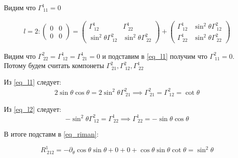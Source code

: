 \documentclass[a4paper]{article}
\numberwithin{equation}{section}
\begin{document}
Видим что $\Gamma^1_{\ 11} = 0$ 

\begin{gather}
    \label{eq_l2}
    l = 2: 
    \begin{pmatrix}
        0 & 0 \\
        0 & 0
    \end{pmatrix}
    = 
    \begin{pmatrix}
        \Gamma^1_{\ 12} & \Gamma^1_{\ 22} \\
        \sin^2 \theta \Gamma^2_{\ 12} & \sin^2 \theta \Gamma^2_{\ 22}
    \end{pmatrix}
    + 
    \begin{pmatrix}
        \Gamma^1_{\ 12} & \sin^2 \theta \Gamma^2_{\ 12}  \\
        \Gamma^1_{\ 22} & \sin^2 \theta \Gamma^2_{\ 22}
    \end{pmatrix}
\end{gather}

Видим что $\Gamma^2_{\ 22} = \Gamma^1_{\ 12} = \Gamma^1_{\ 21} = 0$ 
и подставим в \ref{eq_l1} получим что $\Gamma^2_{\ 11} = 0$. 
Потому будем  считать компонеты $\Gamma^{2}_{\ 21}, \Gamma^{2}_{\ 12}, \Gamma^{1}_{\ 22}$

Из \ref{eq_l1} следует:
\begin{gather}
    2 \sin \theta \cos \theta = 2 \sin^2 \theta \Gamma^2_{\ 21} \implies 
    \Gamma^2_{\ 21} = \Gamma^2_{\ 12} = \cot \theta
\end{gather}

Из \ref{eq_l2} следует:
\begin{equation}
    -\sin^2 \theta \Gamma^2_{\ 12} = \Gamma^1_{\ 22} \implies 
    \Gamma^1_{\ 22} = - \sin \theta \cos \theta
\end{equation}

В итоге подставм в \ref{eq_riman}:

\begin{equation}
    R^{1}_{\ 212} = - \partial_\theta \cos\theta \sin\theta + 0 + 0
    + \cos\theta \sin\theta \cot \theta = \sin^2 \theta
\end{equation}
\end{document}

